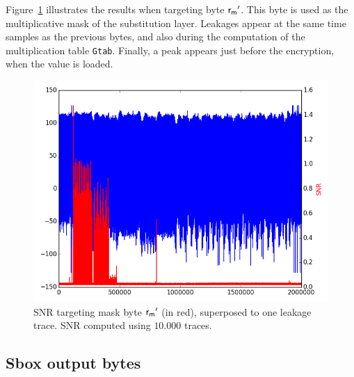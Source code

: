 Figure~\ref{fig:SNR_alpha2} illustrates the results when targeting byte $\mathsf{r_m}'$. This byte is used as the multiplicative mask of the substitution layer.
Leakages appear at the same time samples as the previous bytes, and also during the computation of the multiplication table \texttt{Gtab}.
Finally, a peak appears just before the encryption, when the value is loaded.
\begin{figure}[H]
	\centering 
	\includegraphics[scale=0.35]{figures/2Mpts/SNR_M37_10ktraces.png}
	\caption{SNR targeting mask byte $\mathsf{r_m}'$ (in red), superposed to one leakage trace. SNR computed using $10.000$ traces.}
	\label{fig:SNR_alpha2}
\end{figure}

\subsection{Sbox output bytes}
